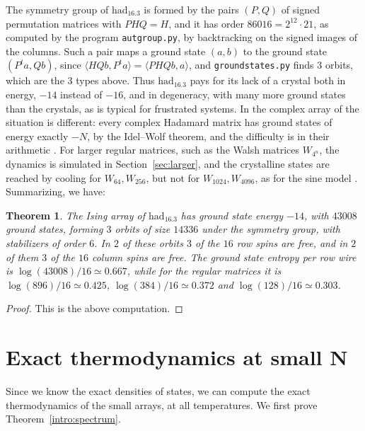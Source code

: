 \documentclass[11pt,a4paper]{article}
\newtheorem{thm}{Theorem}[section]
\theoremstyle{remark}
\begin{document}
The symmetry group of $\mathrm{had}_{16.3}$ is formed by the pairs $(P,Q)$ of signed permutation matrices with $PHQ=H$, and it has order $86016=2^{12}\cdot21$, as computed by the program \texttt{autgroup.py}, by backtracking on the signed images of the columns. Such a pair maps a ground state $(a,b)$ to the ground state $(P^ta,Qb)$, since $\langle HQb,P^ta\rangle=\langle PHQb,a\rangle$, and \texttt{groundstates.py} finds 3 orbits, which are the 3 types above. Thus $\mathrm{had}_{16.3}$ pays for its lack of a crystal both in energy, $-14$ instead of $-16$, and in degeneracy, with many more ground states than the crystals, as is typical for frustrated systems. In the complex array of \cite{cot} the situation is different: every complex Hadamard matrix has ground states of energy exactly $-N$, by the Idel--Wolf theorem, and the difficulty is in their arithmetic \cite{com}. For larger regular matrices, such as the Walsh matrices $W_{4^n}$, the dynamics is simulated in Section~\ref{sec:larger}, and the crystalline states are reached by cooling for $W_{64},W_{256}$, but not for $W_{1024},W_{4096}$, as for the sine model \cite{mp2}. Summarizing, we have:

\begin{samepage}
\begin{thm}\label{thm:ground}
The Ising array of $\mathrm{had}_{16.3}$ has ground state energy $-14$, with $43008$ ground states, forming $3$ orbits of size $14336$ under the symmetry group, with stabilizers of order $6$. In $2$ of these orbits $3$ of the $16$ row spins are free, and in $2$ of them $3$ of the $16$ column spins are free. The ground state entropy per row wire is $\log(43008)/16\simeq0.667$, while for the regular matrices it is $\log(896)/16\simeq0.425$, $\log(384)/16\simeq0.372$ and $\log(128)/16\simeq0.303$.
\end{thm}
\end{samepage}

\begin{proof}
This is the above computation.
\end{proof}

\section{Exact thermodynamics at small N}\label{sec:exact}

Since we know the exact densities of states, we can compute the exact thermodynamics of the small arrays, at all temperatures. We first prove Theorem~\ref{intro:spectrum}.
\end{document}
